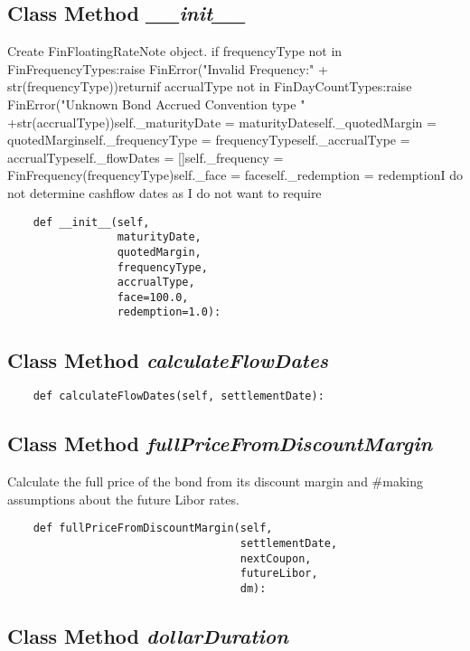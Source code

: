 \documentclass[twoside,11pt]{book}
\begin{document}
\subsection{Class Method {\it \_\_init\_\_}}
Create FinFloatingRateNote object. if frequencyType not in FinFrequencyTypes:raise FinError("Invalid Frequency:" + str(frequencyType))returnif accrualType not in FinDayCountTypes:raise FinError("Unknown Bond Accrued Convention type " +str(accrualType))self.\_maturityDate = maturityDateself.\_quotedMargin = quotedMarginself.\_frequencyType = frequencyTypeself.\_accrualType = accrualTypeself.\_flowDates = []self.\_frequency = FinFrequency(frequencyType)self.\_face = faceself.\_redemption = redemptionI do not determine cashflow dates as I do not want to require

\begin{lstlisting}
    def __init__(self,
                 maturityDate,
                 quotedMargin,
                 frequencyType,
                 accrualType,
                 face=100.0,
                 redemption=1.0):
\end{lstlisting}

\subsection{Class Method {\it calculateFlowDates}}


\begin{lstlisting}
    def calculateFlowDates(self, settlementDate):
\end{lstlisting}

\subsection{Class Method {\it fullPriceFromDiscountMargin}}
Calculate the full price of the bond from its discount margin and \#making assumptions about the future Libor rates. 

\begin{lstlisting}
    def fullPriceFromDiscountMargin(self,
                                    settlementDate,
                                    nextCoupon,
                                    futureLibor,
                                    dm):
\end{lstlisting}

\subsection{Class Method {\it dollarDuration}}
\end{document}
